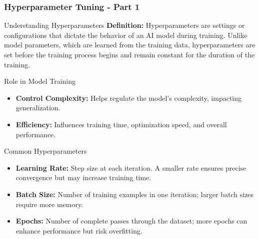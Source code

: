 \documentclass[aspectratio=169]{beamer}
\begin{document}
\begin{frame}[fragile]
    \frametitle{Hyperparameter Tuning - Part 1}

    \begin{block}{Understanding Hyperparameters}
        \textbf{Definition:}
        Hyperparameters are settings or configurations that dictate the behavior of an AI model during training. Unlike model parameters, which are learned from the training data, hyperparameters are set before the training process begins and remain constant for the duration of the training.
    \end{block}

    \begin{block}{Role in Model Training}
        \begin{itemize}
            \item \textbf{Control Complexity:} Helps regulate the model's complexity, impacting generalization.
            \item \textbf{Efficiency:} Influences training time, optimization speed, and overall performance.
        \end{itemize}
    \end{block}

    \begin{block}{Common Hyperparameters}
        \begin{itemize}
            \item \textbf{Learning Rate:} Step size at each iteration. A smaller rate ensures precise convergence but may increase training time.
            \item \textbf{Batch Size:} Number of training examples in one iteration; larger batch sizes require more memory.
            \item \textbf{Epochs:} Number of complete passes through the dataset; more epochs can enhance performance but risk overfitting.
        \end{itemize}
    \end{block}

\end{frame}
\end{document}
